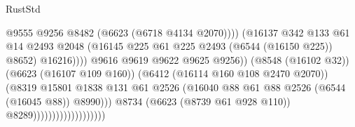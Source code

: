 \begin{lexlean}{RustStd}
\begin{coremodule}
                                                          @9555
                                                          @9256
                                                          @8482
                                                          (@6623 (@6718 @4134 @2070))))
                                                      (@16137
                                                        @342
                                                        @133
                                                        @61
                                                        @14
                                                        @2493
                                                        @2048
                                                        (@16145
                                                          @225
                                                          @61
                                                          @225
                                                          @2493
                                                          (@6544 (@16150 @225))
                                                          @8652)
                                                        @16216))))
                                                @9616
                                                @9619
                                                @9622
                                                @9625
                                                @9256))
                                            (@8548 (@16102 @32))
                                            (@6623 (@16107 @109 @160))
                                            (@6412 (@16114 @160 @108 @2470 @2070))
                                            (@8319
                                              @15801
                                              @1838
                                              @131
                                              @61
                                              @2526
                                              (@16040
                                                @88
                                                @61
                                                @88
                                                @2526
                                                (@6544 (@16045 @88))
                                                @8990)))
                                          @8734
                                          (@6623 (@8739 @61 @928 @110))
                                          @8289)))))))))))))))))))

\end{coremodule}
\end{lexlean}
